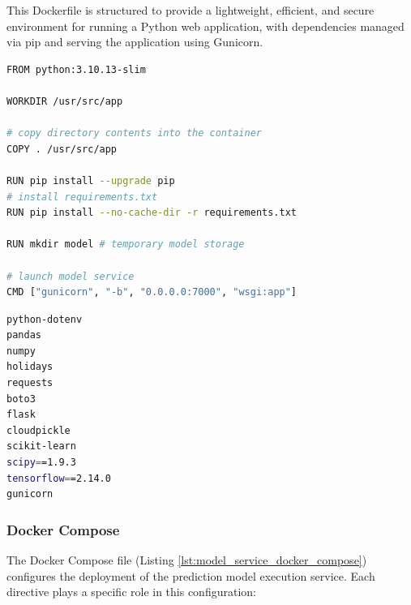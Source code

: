 This Dockerfile is structured to provide a lightweight, efficient, and secure environment for running a Python web application, with dependencies managed via pip and serving the application using Gunicorn. \\

\begin{lstlisting}[language=bash, caption=Model Service Dockerfile, label={lst:model_service_dockerfile}]
FROM python:3.10.13-slim 

WORKDIR /usr/src/app

# copy directory contents into the container
COPY . /usr/src/app

RUN pip install --upgrade pip
# install requirements.txt
RUN pip install --no-cache-dir -r requirements.txt

RUN mkdir model # temporary model storage

# launch model service 
CMD ["gunicorn", "-b", "0.0.0.0:7000", "wsgi:app"]
\end{lstlisting}

\begin{lstlisting}[language=bash, caption=Dependency Requirements Model Service, label={lst:model_service_requirements}]
python-dotenv
pandas
numpy
holidays
requests
boto3 
flask
cloudpickle
scikit-learn
scipy==1.9.3
tensorflow==2.14.0
gunicorn
\end{lstlisting}

\subsubsection{Docker Compose}

The Docker Compose file (Listing \ref{lst:model_service_docker_compose}) configures the deployment of the prediction model execution service. Each directive plays a specific role in this configuration:

